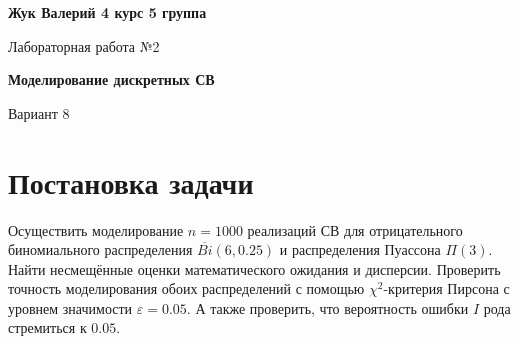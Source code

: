 \documentclass[12pt]{article}
\begin{document}
\textbf{Жук Валерий 4 курс 5 группа}
\\
\begin{center}
	{\Large Лабораторная работа №2}
\end{center} 
\begin{center}
	{\large \textbf{Моделирование дискретных СВ}}
\end{center} 
\begin{center}
	Вариант 8
\end{center}

	\section*{Постановка задачи}
	\par Осуществить моделирование $ n = 1000 $ реализаций СВ для отрицательного биномиального распределения $ \overline{Bi}\left(6, 0.25\right) $ и распределения Пуассона $ \Pi(3) $. Найти несмещённые оценки математического ожидания и дисперсии. Проверить точность моделирования обоих распределений с помощью $ \chi^2 $-критерия Пирсона с уровнем значимости $ \varepsilon = 0.05 $. А также проверить, что вероятность ошибки $ I $ рода стремиться к $ 0.05 $.
\end{document}
